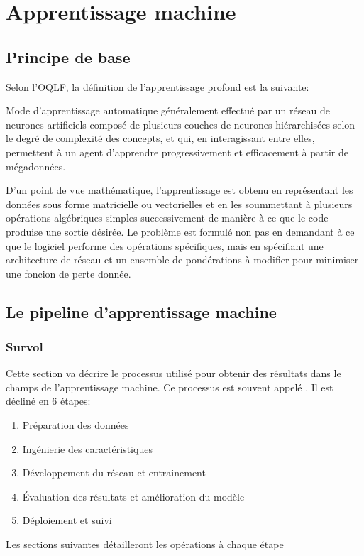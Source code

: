 \section{Apprentissage machine}
  \subsection{Principe de base}
    Selon l'\ac{OQLF}\parencite{oqlf_apprentissage_2024}, la définition de l'apprentissage profond est la suivante:
    \begin{definition}
    Mode d'apprentissage automatique généralement effectué par un réseau de neurones artificiels composé de plusieurs couches de neurones hiérarchisées selon le degré de complexité des concepts, et qui, en interagissant entre elles, permettent à un agent d'apprendre progressivement et efficacement à partir de mégadonnées.
    \end{definition}
    D'un point de vue mathématique, l'apprentissage est obtenu en représentant les données sous forme matricielle ou vectorielles et en les soummettant à plusieurs opérations algébriques simples successivement de manière à ce que le code produise une sortie désirée. Le problème est formulé non pas en demandant à ce que le logiciel performe des opérations spécifiques, mais en spécifiant une architecture de réseau et un ensemble de pondérations à modifier pour minimiser une foncion de perte donnée.
  \subsection{Le pipeline d'apprentissage machine}
  \subsubsection{Survol}
      Cette section va décrire le processus utilisé pour obtenir des résultats dans le champs de l'apprentissage machine. Ce processus est souvent appelé  \fg{}. Il est décliné en 6 étapes:
        \begin{enumerate}
          \item Préparation des données
          \item Ingénierie des caractéristiques
          \item Développement du réseau et entrainement
          \item Évaluation des résultats et amélioration du modèle
          \item Déploiement et suivi
        \end{enumerate}
      Les sections suivantes détailleront les opérations à chaque étape
